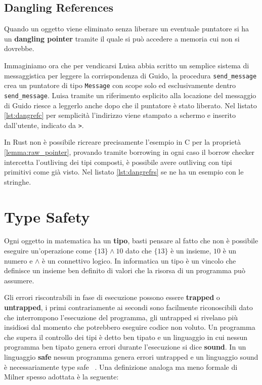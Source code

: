 \documentclass[Lau,binding=0.6cm]{sapthesis}
\newcommand{\textcode}[1]{\colorbox{backcolour}{\texttt{#1}}}
\begin{document}
\section{Dangling References} \label{sec:dangling_reference}
Quando un oggetto viene eliminato senza liberare un eventuale puntatore si ha un \textbf{dangling pointer} tramite il quale si può accedere a memoria cui non si dovrebbe.

Immaginiamo ora che per vendicarsi Luisa abbia scritto un semplice sistema di messaggistica per leggere la corrispondenza di Guido, la procedura \textcode{send\_message} crea un puntatore di tipo \textcode{Message} con scope solo ed esclusivamente dentro \textcode{send\_message}. 
Luisa tramite un riferimento esplicito alla locazione del messaggio di Guido riesce a leggerlo anche dopo che il puntatore è stato liberato.
Nel listato \ref{lst:dangrefc} per semplicità l'indirizzo viene stampato a schermo e inserito dall'utente, indicato da \textcode{>}.




In Rust non è possibile ricreare precisamente l'esempio in C per la proprietà \ref{lemma:raw_pointer}, provando tramite borrowing in ogni caso il borrow checker intercetta l'outliving dei tipi composti, è possibile avere outliving con tipi primitivi come già visto. 
Nel listato \ref{lst:dangrefrs} se ne ha un esempio con le stringhe.



\chapter{Type Safety} \label{chap:type_safety}
Ogni oggetto in matematica ha un \textbf{tipo}, basti pensare al fatto che non è possibile eseguire un'operazione come $ \{13\} \land 10 $ dato che $\{13\}$ è un insieme, $10$ è un numero e $\land$ è un connettivo logico. 
In informatica un tipo è un vincolo che definisce un insieme ben definito di valori che la risorsa di un programma può assumere.

Gli errori riscontrabili in fase di esecuzione possono essere \textbf{trapped} o \textbf{untrapped}, i primi contrariamente ai secondi sono facilmente riconoscibili dato che interrompono l'esecuzione del programma, gli untrapped si rivelano più insidiosi dal momento che potrebbero eseguire codice non voluto.
Un programma che supera il controllo dei tipi è detto ben tipato e un linguaggio in cui nessun programma ben tipato genera errori durante l'esecuzione si dice \textbf{sound}.
In un linguaggio \textbf{safe} nessun programma genera errori untrapped e un linguaggio sound è necessariamente type safe ~\cite{cencia:dispense}.
Una definizione analoga ma meno formale di Milner spesso adottata è la seguente:
\end{document}
